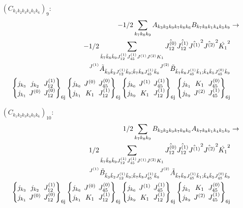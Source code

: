 \documentclass[11pt]{article}
\newcommand{\sixj}[6]{\begingroup\setlength{\arraycolsep}{0.2em}\begin{Bmatrix} #1 & #2 & #3 \\ #4 & #5 & #6 \end{Bmatrix}_{\text{6j}}\endgroup}
\begin{document}
$\left({C}_{{k}_{1}{k}_{2}{k}_{3}{k}_{4}{k}_{5}{k}_{6}}\right)_{9}$:
\begin{align}
-1/2\sum_{{k}_{7}{k}_{8}{k}_{9}}{A}_{{k}_{3}{k}_{2}{k}_{9}{k}_{7}{k}_{8}{k}_{6}}{B}_{{k}_{7}{k}_{8}{k}_{1}{k}_{4}{k}_{5}{k}_{9}}&\rightarrow \notag \\-1/2\sum_{\tilde{k}_{7}\tilde{k}_{8}\tilde{k}_{9}J^{(1)}_{12}J^{(1)}_{45}J^{(1)}J^{(2)}K_{1}}\hat{J^{(0)}_{12}}\hat{J^{(1)}_{12}}\hat{J^{(1)}}^{2}\hat{J^{(2)}}^{2}\hat{K_{1}}^{2}& \notag \\{}^{J^{(1)}}\tilde{A}_{\tilde{k}_{3}\tilde{k}_{2}J^{(1)}_{12}\tilde{k}_{9};\tilde{k}_{7}\tilde{k}_{8}J^{(1)}_{45}\tilde{k}_{6}}{}^{J^{(2)}}\tilde{B}_{\tilde{k}_{7}\tilde{k}_{8}J^{(1)}_{45}\tilde{k}_{1};\tilde{k}_{4}\tilde{k}_{5}J^{(0)}_{45}\tilde{k}_{9}}& \notag \\\sixj{j_{{k}_{3}}}{j_{{k}_{2}}}{J^{(1)}_{12}}{j_{{k}_{1}}}{J^{(0)}}{J^{(0)}_{12}}\sixj{j_{{k}_{6}}}{J^{(0)}}{J^{(0)}_{45}}{j_{{k}_{1}}}{K_{1}}{J^{(1)}_{12}}\sixj{j_{{k}_{6}}}{J^{(1)}}{J^{(1)}_{45}}{j_{{k}_{9}}}{K_{1}}{J^{(1)}_{12}}\sixj{j_{{k}_{1}}}{K_{1}}{J^{(0)}_{45}}{j_{{k}_{9}}}{J^{(2)}}{J^{(1)}_{45}}
\end{align}

$\left({C}_{{k}_{1}{k}_{2}{k}_{3}{k}_{4}{k}_{5}{k}_{6}}\right)_{10}$:
\begin{align}
1/2\sum_{{k}_{7}{k}_{8}{k}_{9}}{B}_{{k}_{3}{k}_{2}{k}_{9}{k}_{7}{k}_{8}{k}_{6}}{A}_{{k}_{7}{k}_{8}{k}_{1}{k}_{4}{k}_{5}{k}_{9}}&\rightarrow \notag \\1/2\sum_{\tilde{k}_{7}\tilde{k}_{8}\tilde{k}_{9}J^{(1)}_{12}J^{(1)}_{45}J^{(1)}J^{(2)}K_{1}}\hat{J^{(0)}_{12}}\hat{J^{(1)}_{12}}\hat{J^{(1)}}^{2}\hat{J^{(2)}}^{2}\hat{K_{1}}^{2}& \notag \\{}^{J^{(1)}}\tilde{B}_{\tilde{k}_{3}\tilde{k}_{2}J^{(1)}_{12}\tilde{k}_{9};\tilde{k}_{7}\tilde{k}_{8}J^{(1)}_{45}\tilde{k}_{6}}{}^{J^{(2)}}\tilde{A}_{\tilde{k}_{7}\tilde{k}_{8}J^{(1)}_{45}\tilde{k}_{1};\tilde{k}_{4}\tilde{k}_{5}J^{(0)}_{45}\tilde{k}_{9}}& \notag \\\sixj{j_{{k}_{3}}}{j_{{k}_{2}}}{J^{(1)}_{12}}{j_{{k}_{1}}}{J^{(0)}}{J^{(0)}_{12}}\sixj{j_{{k}_{6}}}{J^{(0)}}{J^{(0)}_{45}}{j_{{k}_{1}}}{K_{1}}{J^{(1)}_{12}}\sixj{j_{{k}_{6}}}{J^{(1)}}{J^{(1)}_{45}}{j_{{k}_{9}}}{K_{1}}{J^{(1)}_{12}}\sixj{j_{{k}_{1}}}{K_{1}}{J^{(0)}_{45}}{j_{{k}_{9}}}{J^{(2)}}{J^{(1)}_{45}}
\end{align}
\end{document}
